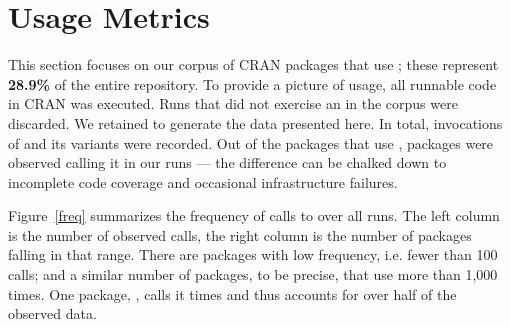 \documentclass[acmsmall]{acmart}
\begin{document}
\section{Usage Metrics}

This section focuses on our corpus of \Corpus CRAN packages that use
\eval; these represent {\bf 28.9\%} of the entire repository. To provide %
a picture of \eval usage, all runnable code in CRAN was executed. Runs
that did not exercise an \eval in the corpus were discarded. We
retained \Nbruns to generate the data presented here. In total,
\Allcalls invocations of \eval and its variants were recorded. Out of
the \Staticatleastonecallsite packages that use \eval, \Triggeredpkgs
packages were observed calling it in our runs --- the difference can
be chalked down to incomplete code coverage and occasional
infrastructure failures.


Figure~\ref{freq} summarizes the frequency of calls to \eval over all
runs. The left column is the number of observed calls, the right
column is the number of packages falling in that range. There are
\Fewcalls packages with low \eval frequency, i.e. fewer than 100
calls; and a similar number of packages, \Manycalls to be precise,
that use \eval more than 1,000 times. One package, \Maxcallspack,
calls it \Maxcalls times and thus accounts for over half of the
observed data.
\end{document}
